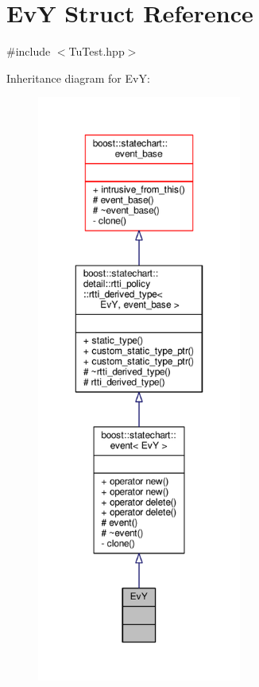 \hypertarget{struct_ev_y}{}\section{EvY Struct Reference}
\label{struct_ev_y}


{\ttfamily \#include $<$Tu\+Test.\+hpp$>$}



Inheritance diagram for EvY\+:
\nopagebreak
\begin{figure}[H]
\begin{center}
\leavevmode
\includegraphics[height=550pt]{struct_ev_y__inherit__graph}
\end{center}
\end{figure}


